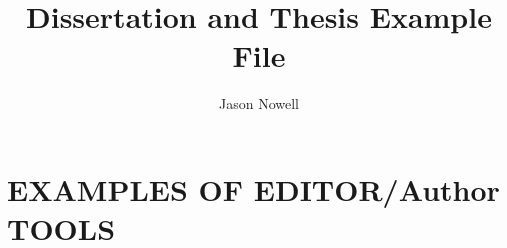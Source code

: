 \documentclass[editMode]{ufdissertation}\sloppy
\title{Dissertation and Thesis Example File}%
\author{Jason Nowell}%
\begin{document}


\chapter{EXAMPLES OF EDITOR/Author TOOLS}%

\end{document}
